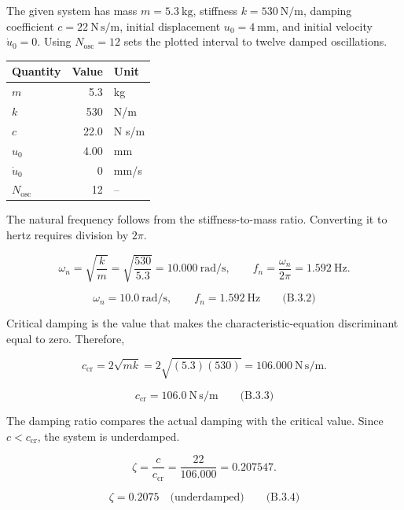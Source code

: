 \begingroup
\setlength{\abovedisplayskip}{6pt}
\setlength{\belowdisplayskip}{6pt}
\setlength{\abovedisplayshortskip}{4pt}
\setlength{\belowdisplayshortskip}{4pt}
\setlength{\intextsep}{6pt}

The given system has mass $m=5.3\ \mathrm{kg}$, stiffness $k=530\ \mathrm{N/m}$, damping coefficient $c=22\ \mathrm{N\,s/m}$, initial displacement $u_0=4\ \mathrm{mm}$, and initial velocity $\dot{u}_0=0$. Using $N_{\mathrm{osc}}=12$ sets the plotted interval to twelve damped oscillations.

{ %
\begin{center}\small\begin{tabular}{@{}lrl@{}}
\toprule\noalign{}
Quantity & Value & Unit \\
\midrule\noalign{}
$m$ & 5.3 & kg \\
$k$ & 530 & N/m \\
$c$ & 22.0 & N s/m \\
$u_0$ & 4.00 & mm \\
$\dot{u}_0$ & 0 & mm/s \\
$N_{\mathrm{osc}}$ & 12 & -- \\
\bottomrule\end{tabular}\end{center}
}

The natural frequency follows from the stiffness-to-mass ratio. Converting it to hertz requires division by $2\pi$.

\[
\omega_n=\sqrt{\frac{k}{m}}=\sqrt{\frac{530}{5.3}}=10.000\ \mathrm{rad/s},
\qquad
f_n=\frac{\omega_n}{2\pi}=1.592\ \mathrm{Hz}.
\]

\[
\boxed{\omega_n=10.0\ \mathrm{rad/s},\qquad f_n=1.592\ \mathrm{Hz}}
\qquad\text{(B.3.2)}
\]

Critical damping is the value that makes the characteristic-equation discriminant equal to zero. Therefore,

\[
c_{\mathrm{cr}}=2\sqrt{mk}=2\sqrt{(5.3)(530)}=106.000\ \mathrm{N\,s/m}.
\]

\[
\boxed{c_{\mathrm{cr}}=106.0\ \mathrm{N\,s/m}}
\qquad\text{(B.3.3)}
\]

The damping ratio compares the actual damping with the critical value. Since $c<c_{\mathrm{cr}}$, the system is underdamped.

\[
\zeta=\frac{c}{c_{\mathrm{cr}}}=\frac{22}{106.000}=0.207547.
\]

\[
\boxed{\zeta=0.2075\quad\text{(underdamped)}}
\qquad\text{(B.3.4)}
\]

